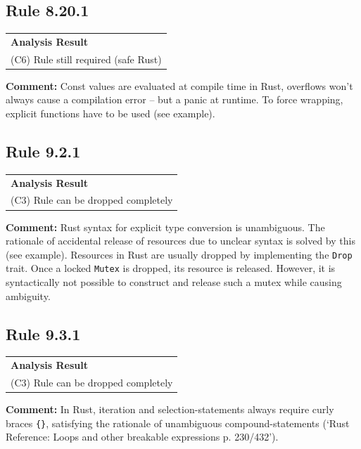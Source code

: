 \subsection*{Rule 8.20.1}
\begin{longtable}{p{13cm}}
\textbf{Analysis Result} \\
(C6) Rule still required (safe Rust) \\
\end{longtable}
\textbf{Comment:} Const values are evaluated at compile time in Rust, overflows won't always cause a compilation error – but a panic at runtime. To force wrapping, explicit functions have to be used (see example). \\


\subsection*{Rule 9.2.1}
\begin{longtable}{p{13cm}}
\textbf{Analysis Result} \\
(C3) Rule can be dropped completely \\
\end{longtable}
\textbf{Comment:} Rust syntax for explicit type conversion is unambiguous. The rationale of accidental release of resources due to unclear syntax is solved by this (see example). Resources in Rust are usually dropped by implementing the \texttt{Drop} trait. Once a locked \texttt{Mutex} is dropped, its resource is released. However, it is syntactically not possible to construct and release such a mutex while causing ambiguity. \\


\subsection*{Rule 9.3.1}
\begin{longtable}{p{13cm}}
\textbf{Analysis Result} \\
(C3) Rule can be dropped completely \\
\end{longtable}
\textbf{Comment:} In Rust, iteration and selection-statements always require curly braces \texttt{\{\}}, satisfying the rationale of unambiguous compound-statements (`Rust Reference: Loops and other breakable expressions p. 230/432'). \\

